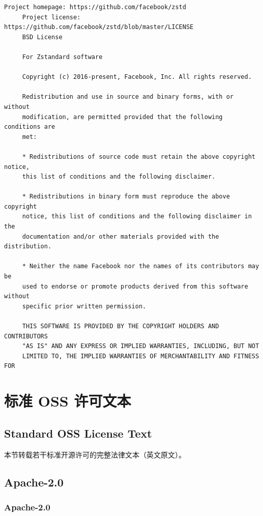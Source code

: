 \begin{lstlisting}[basicstyle=\ttfamily\footnotesize,breaklines=true]
     Project homepage: https://github.com/facebook/zstd
     Project license: https://github.com/facebook/zstd/blob/master/LICENSE
     BSD License

     For Zstandard software

     Copyright (c) 2016-present, Facebook, Inc. All rights reserved.

     Redistribution and use in source and binary forms, with or without
     modification, are permitted provided that the following conditions are
     met:

     * Redistributions of source code must retain the above copyright notice,
     this list of conditions and the following disclaimer.

     * Redistributions in binary form must reproduce the above copyright
     notice, this list of conditions and the following disclaimer in the
     documentation and/or other materials provided with the distribution.

     * Neither the name Facebook nor the names of its contributors may be
     used to endorse or promote products derived from this software without
     specific prior written permission.

     THIS SOFTWARE IS PROVIDED BY THE COPYRIGHT HOLDERS AND CONTRIBUTORS
     "AS IS" AND ANY EXPRESS OR IMPLIED WARRANTIES, INCLUDING, BUT NOT
     LIMITED TO, THE IMPLIED WARRANTIES OF MERCHANTABILITY AND FITNESS FOR
\end{lstlisting}

\section{标准 OSS 许可文本}
\subsection*{Standard OSS License Text}

本节转载若干标准开源许可的完整法律文本（英文原文）。

\subsection{Apache-2.0}
\subsubsection*{Apache-2.0}

